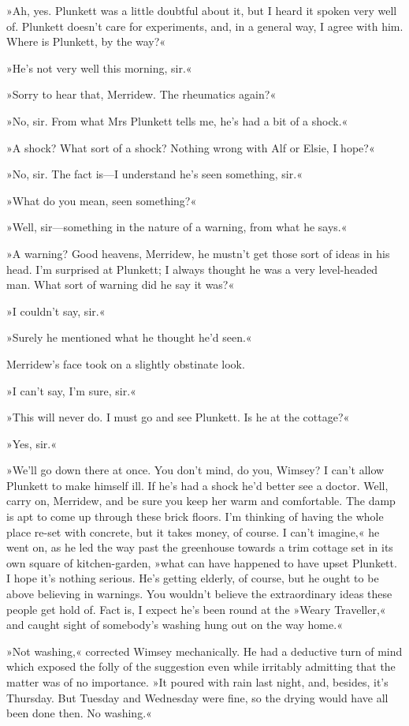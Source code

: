 »Ah, yes. Plunkett was a little doubtful about it, but I heard it spoken very well of. Plunkett doesn't care for experiments, and, in a general way, I agree with him. Where is Plunkett, by the way?«

»He's not very well this morning, sir.«

»Sorry to hear that, Merridew. The rheumatics again?«

»No, sir. From what Mrs Plunkett tells me, he's had a bit of a shock.«

»A shock? What sort of a shock? Nothing wrong with Alf or Elsie, I hope?«

»No, sir. The fact is—I understand he's seen something, sir.«

»What do you mean, seen something?«

»Well, sir—something in the nature of a warning, from what he says.«

»A warning? Good heavens, Merridew, he mustn't get those sort of ideas in his head. I'm surprised at Plunkett; I always thought he was a very level-headed man. What sort of warning did he say it was?«

»I couldn't say, sir.«

»Surely he mentioned what he thought he'd seen.«

Merridew's face took on a slightly obstinate look.

»I can't say, I'm sure, sir.«

»This will never do. I must go and see Plunkett. Is he at the cottage?«

»Yes, sir.«

»We'll go down there at once. You don't mind, do you, Wimsey? I can't allow Plunkett to make himself ill. If he's had a shock he'd better see a doctor. Well, carry on, Merridew, and be sure you keep her warm and comfortable. The damp is apt to come up through these brick floors. I'm thinking of having the whole place re-set with concrete, but it takes money, of course. I can't imagine,« he went on, as he led the way past the greenhouse towards a trim cottage set in its own square of kitchen-garden, »what can have happened to have upset Plunkett. I hope it's nothing serious. He's getting elderly, of course, but he ought to be above believing in warnings. You wouldn't believe the extraordinary ideas these people get hold of. Fact is, I expect he's been round at the »Weary Traveller,« and caught sight of somebody's washing hung out on the way home.«

»Not washing,« corrected Wimsey mechanically. He had a deductive turn of mind which exposed the folly of the suggestion even while irritably admitting that the matter was of no importance. »It poured with rain last night, and, besides, it's Thursday. But Tuesday and Wednesday were fine, so the drying would have all been done then. No washing.«

